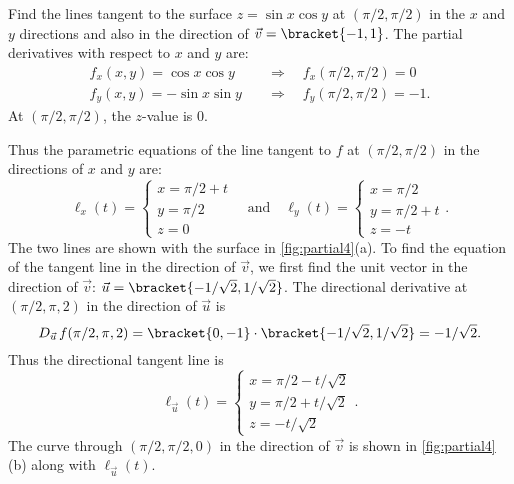 
\begin{example}\label{ex_tpl1}
Find the lines tangent to the surface $z=\sin x\cos y$ at $(\pi/2,\pi/2)$ in the $x$ and $y$ directions and also in the direction of $\vec v =\bracket{-1,1}$.
\solution
The partial derivatives with respect to $x$ and $y$ are:
\begin{align*}
f_x(x,y) = \cos x\cos y\quad &\Rightarrow \quad f_x(\pi/2,\pi/2) = 0\\
f_y(x,y) = -\sin x\sin y\quad&\Rightarrow \quad f_y(\pi/2,\pi/2)=-1.
\end{align*}
At $(\pi/2,\pi/2)$, the $z$-value is 0.

Thus the parametric equations of the line tangent to $f$ at $(\pi/2,\pi/2)$ in the directions of $x$  and $y$ are:
%
%
\[
\ell_x(t) = \begin{cases}x=\pi/2 + t\\ y=\pi/2 \\z=0 \end{cases}
\quad \text{and}\quad 
\ell_y(t) = \begin{cases}x=\pi/2 \\ y=\pi/2+t \\z=-t \end{cases}.
\]
The two lines are shown with the surface in \autoref{fig:partial4}(a). To find the equation of the tangent line in the direction of $\vec v$, we first find the unit vector in the direction of $\vec v$: $\vec u =\bracket{-1/\sqrt{2},1/\sqrt{2}}$. The directional derivative at $(\pi/2,\pi,2)$ in the direction of $\vec u$ is 
\[D_{\vec u\,}f(\pi/2,\pi,2) =\bracket{0,-1}\cdot\bracket{-1/\sqrt{2},1/\sqrt 2}= -1/\sqrt 2.\]
Thus the directional tangent line is 
\[\ell_{\vec u}(t) = \begin{cases}x= \pi/2 -t/\sqrt{2}\\ y = \pi/2 + t/\sqrt{2} \\ z= -t/\sqrt{2}\end{cases}.\]
The curve through $(\pi/2,\pi/2,0)$ in the direction of $\vec v$ is shown in \autoref{fig:partial4}(b) along with $\ell_{\vec u}(t)$.
\end{example}

